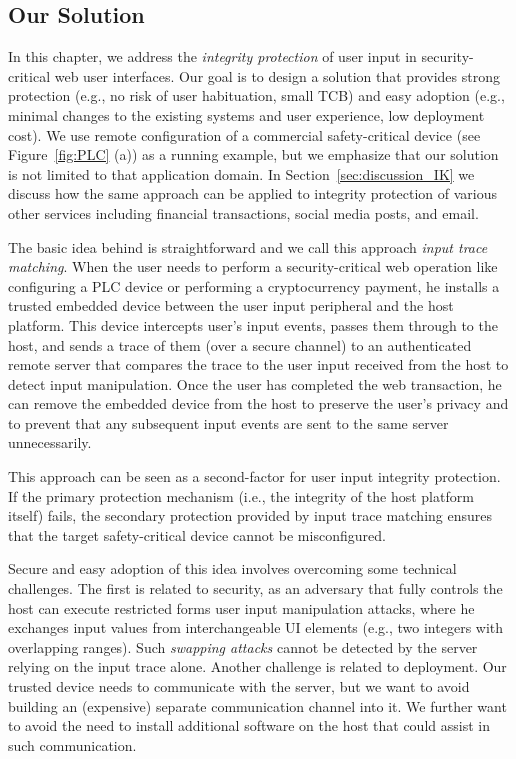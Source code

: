 \subsection{Our Solution} 

In this chapter, we address the \emph{integrity protection} of user input in security-critical web user interfaces. Our goal is to design a solution that provides strong protection (e.g., no risk of user habituation, small TCB) and easy adoption (e.g., minimal changes to the existing systems and user experience, low deployment cost). We use remote configuration of a commercial safety-critical device (see Figure~\ref{fig:PLC} (a)) as a running example, but we emphasize that our solution is not limited to that application domain. In Section~\ref{sec:discussion_IK} we discuss how the same approach can be applied to integrity protection of various other services including financial transactions, social media posts, and email.

The basic idea behind \name is straightforward and we call this approach \emph{input trace matching}.  When the user needs to perform a security-critical web operation like configuring a PLC device or performing a cryptocurrency payment, he installs a trusted embedded device between the user input peripheral and the host platform. This device intercepts user's input events, passes them through to the host, and sends a trace of them (over a secure channel) to an authenticated remote server that compares the trace to the user input received from the host to detect input manipulation. Once the user has completed the web transaction, he can remove the embedded device from the host to preserve the user's privacy and to prevent that any subsequent input events are sent to the same server unnecessarily.

This approach can be seen as a second-factor for user input integrity protection. If the primary protection mechanism (i.e., the integrity of the host platform itself) fails, the secondary protection provided by input trace matching ensures that the target safety-critical device cannot be misconfigured.

Secure and easy adoption of this idea involves overcoming some technical challenges. The first is related to security, as an adversary that fully controls the host can execute restricted forms user input manipulation attacks, where he exchanges input values from interchangeable UI elements (e.g., two integers with overlapping ranges). Such \emph{swapping attacks} cannot be detected by the server relying on the input trace alone. Another challenge is related to deployment. Our trusted device needs to communicate with the server, but we want to avoid building an (expensive) separate communication channel into it. We further want to avoid the need to install additional software on the host that could assist in such communication. 


